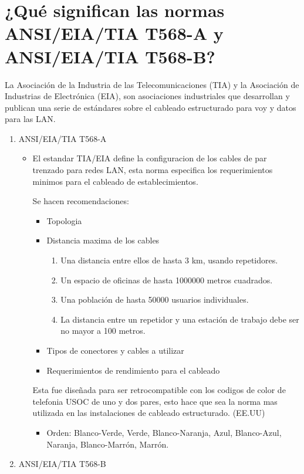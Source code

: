 \documentclass[a4paper,12pt]{article}
\begin{document}
\section{¿Qué significan las normas ANSI/EIA/TIA T568-A y ANSI/EIA/TIA T568-B?}
La Asociación de la Industria de las Telecomunicaciones (TIA) y la Asociación de Industrias de Electrónica (EIA), son asociaciones industriales que desarrollan y publican una serie de estándares sobre el cableado estructurado para voy y datos para las LAN.
\begin{enumerate}
    \item ANSI/EIA/TIA T568-A
    \begin{itemize}
        \item El estandar TIA/EIA define la configuracion de los cables de par trenzado para redes LAN, esta norma especifica los requerimientos minimos para el cableado de establecimientos.
        
        Se hacen recomendaciones:
        \begin{itemize}
            \item Topologia 
            \item Distancia maxima de los cables 
            \begin{enumerate}
                \item Una distancia entre ellos de hasta 3 km, usando repetidores.
                \item Un espacio de oficinas de hasta 1000000 metros cuadrados.
                \item Una población de hasta 50000 usuarios individuales.
                \item La distancia entre un repetidor y una estación de trabajo debe ser no mayor a 100 metros.
            \end{enumerate}
            \item Tipos de conectores y cables a utilizar
            \item Requerimientos de rendimiento para el cableado
        \end{itemize}
        Esta fue diseñada para ser retrocompatible con los codigos de color de telefonia USOC de uno y dos pares, esto hace que sea la norma mas utilizada en las instalaciones de cableado estructurado. (EE.UU)
        \begin{itemize}
            \item Orden: Blanco-Verde, Verde, Blanco-Naranja, Azul, Blanco-Azul, Naranja, Blanco-Marrón, Marrón.
        \end{itemize}
    \end{itemize}
    \item ANSI/EIA/TIA T568-B
    

\end{enumerate}
\end{document}

